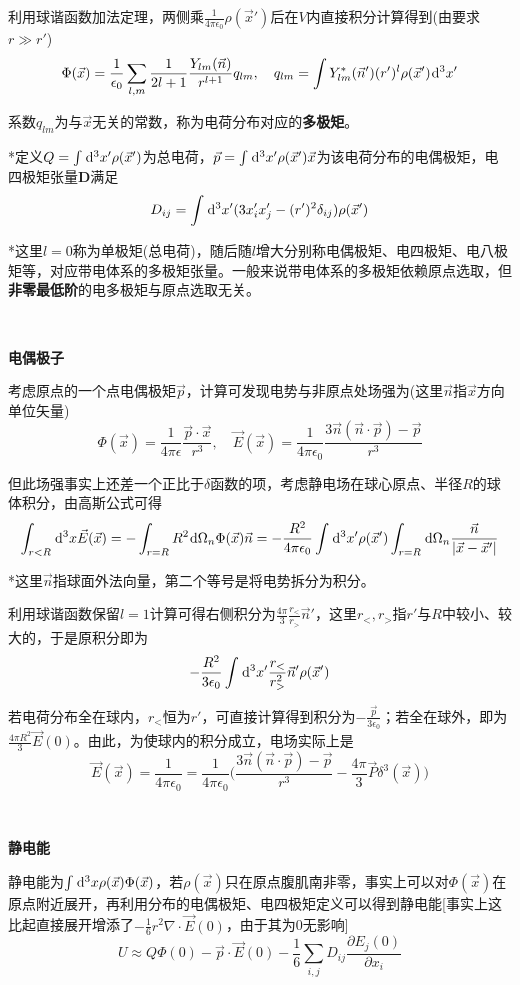 \documentclass[a4paper,UTF8,fontset=windows]{ctexart}
\newcommand*{\dr}{\hspace{0.07em}\mathrm{d}}
\newcommand*{\ve}{\vec{E}}
\newcommand*{\vp}{\vec{P}}
\newcommand*{\vns}{\vec{n}}
\newcommand*{\vps}{\vec{p}}
\newcommand*{\vx}{\vec{x}}
\begin{document}
利用球谐函数加法定理，两侧乘$\frac{1}{4\pi\epsilon_0}\rho(\vx')$后在$V$内直接积分计算得到(由要求$r\gg r'$)
$$\Phi(\vx)=\frac{1}{\epsilon_0}\sum_{l,m}\frac{1}{2l+1}\frac{Y_{lm}(\vns)}{r^{l+1}}q_{lm},\quad q_{lm}=\int Y^*_{lm}(\vns')(r')^l\rho(\vx')\dr^3x'$$

系数$q_{lm}$为与$\vx$无关的常数，称为电荷分布对应的\textbf{多极矩}。

*定义$Q=\int\dr^3x'\rho(\vx')$为总电荷，$\vps=\int\dr^3x'\rho(\vx')\vx$为该电荷分布的电偶极矩，电四极矩张量$\mathbf{D}$满足
$$D_{ij}=\int\dr^3x'(3x_i'x_j'-(r')^2\delta_{ij})\rho(\vx')$$

*这里$l=0$称为单极矩(总电荷)，随后随$l$增大分别称电偶极矩、电四极矩、电八极矩等，对应带电体系的多极矩张量。一般来说带电体系的多极矩依赖原点选取，但\textbf{非零最低阶}的电多极矩与原点选取无关。

\

\textbf{电偶极子}

考虑原点的一个点电偶极矩$\vps$，计算可发现电势与非原点处场强为(这里$\vns$指$\vx$方向单位矢量)
$$\Phi(\vx)=\frac{1}{4\pi\epsilon}\frac{\vps\cdot\vx}{r^3},\quad\ve(\vx)=\frac{1}{4\pi\epsilon_0}\frac{3\vns(\vns\cdot\vps)-\vps}{r^3}$$

但此场强事实上还差一个正比于$\delta$函数的项，考虑静电场在球心原点、半径$R$的球体积分，由高斯公式可得
$$\int_{r<R}\dr^3x\ve(\vx)=-\int_{r=R}R^2\dr\Omega_n\Phi(\vx)\vns=-\frac{R^2}{4\pi\epsilon_0}\int\dr^3x'\rho(\vx')\int_{r=R}\dr\Omega_n\frac{\vns}{|\vx-\vx'|}$$

*这里$\vns$指球面外法向量，第二个等号是将电势拆分为积分。

利用球谐函数保留$l=1$计算可得右侧积分为$\frac{4\pi}{3}\frac{r_<}{r_>}\vns'$，这里$r_<,r_>$指$r'$与$R$中较小、较大的，于是原积分即为
$$-\frac{R^2}{3\epsilon_0}\int\dr^3x'\frac{r_<}{r_>^2}\vns'\rho(\vx')$$

若电荷分布全在球内，$r_<$恒为$r'$，可直接计算得到积分为$-\frac{\vps}{3\epsilon_0}$；若全在球外，即为$\frac{4\pi R^2}{3}\ve(0)$。由此，为使球内的积分成立，电场实际上是
$$\ve(\vx)=\frac{1}{4\pi\epsilon_0}=\frac{1}{4\pi\epsilon_0}\bigg(\frac{3\vns(\vns\cdot\vps)-\vps}{r^3}-\frac{4\pi}{3}\vp\delta^3(\vx)\bigg)$$

\

\textbf{静电能}

静电能为$\int\dr^3x\rho(\vx)\Phi(\vx)$，若$\rho(\vx)$只在原点腹肌南非零，事实上可以对$\Phi(\vx)$在原点附近展开，再利用分布的电偶极矩、电四极矩定义可以得到静电能[事实上这比起直接展开增添了$-\frac{1}{6}r^2\nabla\cdot\ve(0)$，由于其为0无影响]
$$U\approx Q\Phi(0)-\vps\cdot\ve(0)-\frac{1}{6}\sum_{i,j}D_{ij}\frac{\partial E_j(0)}{\partial x_i}$$
\end{document}
